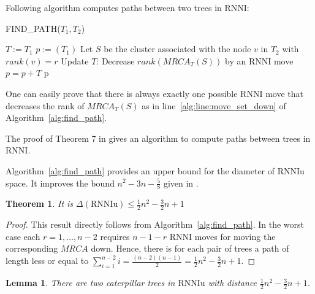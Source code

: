 \documentclass[11pt, a4paper]{article}
\newcommand{\rnni}{\mathrm{RNNI}}
\newcommand{\rnniu}{\mathrm{RNNIu}}
\newtheorem{theorem}[definition]{Theorem}
\newtheorem{lemma}[definition]{Lemma}
\begin{document}
Following algorithm computes paths between two trees in $\rnni$:

\begin{algorithm}[H]
\caption{FIND\_PATH($T_1,T_2$)}
\label{alg:find_path}
\begin{algorithmic}[1]
	\STATE $T := T_1$
	\STATE $p := (T_1)$
		\STATE Let $S$ be the cluster associated with the node $v$ in $T_2$ with $rank(v) = r$
			\STATE Update $T$: Decrease $rank(MRCA_T(S))$ by an $\rnni$ move \label{alg:line:move_set_down}
			\STATE $p = p+T$
		\ENDWHILE
	\ENDFOR
	\RETURN p
\end{algorithmic}
\end{algorithm}

One can easily prove that there is always exactly one possible $\rnni$ move that decreases the rank of $MRCA_T(S)$ as in line~\ref{alg:line:move_set_down} of Algorithm~\ref{alg:find_path}.

The proof of Theorem 7 in \cite{Gavryushkin2017} gives an algorithm to compute paths between trees in $\rnni$. %



Algorithm~\ref{alg:find_path} provides an upper bound for the diameter of $\rnniu$ space.
It improves the bound $n^2 - 3n - \frac{5}{8}$ given in \cite{Gavryushkin2017}.

\begin{theorem}
	It is $\Delta(\rnniu) \leq \frac{1}{2}n^2-\frac{3}{2}n+1$
\end{theorem}

\begin{proof}
	This result directly follows from Algorithm~\ref{alg:find_path}.
	In the worst case each $r = 1, \dots, n-2$ requires $n-1-r$ $\rnni$ moves for moving the corresponding $MRCA$ down.
	Hence, there is for each pair of trees a path of length less or equal to $\sum\limits_{i = 1}^{n-2} i = \frac{(n-2)(n-1)}{2} = \frac{1}{2}n^2-\frac{3}{2}n+1$.
\end{proof}

\begin{lemma}
	There are two caterpillar trees in $\rnniu$ with distance $\frac{1}{2}n^2-\frac{3}{2}n+1$.
	\label{conj:caterpillar_diameter}
\end{lemma}
\end{document}
